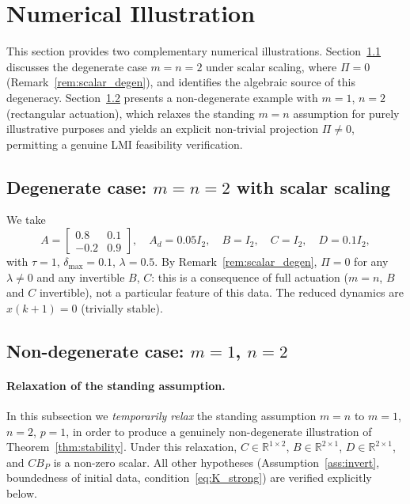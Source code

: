 \documentclass[10pt]{amsart}
\numberwithin{equation}{section}
\begin{document}
\section{Numerical Illustration}\label{sec:numerical}

This section provides two complementary numerical illustrations.
Section~\ref{sec:deg_example} discusses the degenerate case $m=n=2$ under scalar
scaling, where $\Pi = 0$ (Remark~\ref{rem:scalar_degen}), and identifies the algebraic
source of this degeneracy. Section~\ref{sec:nondeg} presents a non-degenerate example
with $m=1$, $n=2$ (rectangular actuation), which relaxes the standing $m=n$ assumption
for purely illustrative purposes and yields an explicit non-trivial projection
$\Pi \neq 0$, permitting a genuine LMI feasibility verification.

\subsection{Degenerate case: \texorpdfstring{$m=n=2$}{m=n=2} with scalar scaling}
\label{sec:deg_example}
We take
\[
A = \begin{bmatrix} 0.8 & 0.1 \\ -0.2 & 0.9 \end{bmatrix}, \quad
A_d = 0.05 I_2, \quad B = I_2, \quad C = I_2, \quad D = 0.1 I_2,
\]
with $\tau=1$, $\delta_{\max}=0.1$, $\lambda=0.5$. By Remark~\ref{rem:scalar_degen},
$\Pi = 0$ for any $\lambda \neq 0$ and any invertible $B$, $C$: this is a consequence
of full actuation ($m=n$, $B$ and $C$ invertible), not a particular feature of this
data. The reduced dynamics are $x(k+1)=0$ (trivially stable).

\subsection{Non-degenerate case: \texorpdfstring{$m=1$, $n=2$}{m=1, n=2}}
\label{sec:nondeg}

\paragraph{Relaxation of the standing assumption.}
In this subsection we \emph{temporarily relax} the standing assumption $m=n$ to
$m=1$, $n=2$, $p=1$, in order to produce a genuinely non-degenerate illustration of
Theorem~\ref{thm:stability}. Under this relaxation, $C \in \mathbb{R}^{1\times 2}$,
$B \in \mathbb{R}^{2\times 1}$, $D \in \mathbb{R}^{2\times 1}$, and $CB_P$ is a
non-zero scalar. All other hypotheses (Assumption~\ref{ass:invert}, boundedness of
initial data, condition~\eqref{eq:K_strong}) are verified explicitly below.
\end{document}
